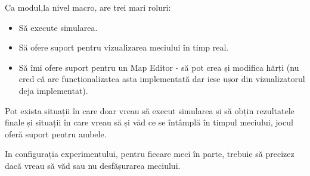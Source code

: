 \documentclass{article}
\begin{document}
Ca modul,la nivel macro, are trei mari roluri:
\begin{itemize}
    \item Să execute simularea.
    \item Să ofere suport pentru vizualizarea meciului în timp real.
    \item Să îmi ofere suport pentru un Map Editor - să pot crea și modifica hărți (nu cred că are funcționalizatea asta implementată dar iese ușor din vizualizatorul deja implementat).
\end{itemize}

Pot exista situații în care doar vreau să execut simularea și să obțin rezultatele finale și situații în care vreau să și văd ce se întâmplă în timpul meciului, jocul oferă suport pentru ambele.

In configurația experimentului, pentru fiecare meci în parte, trebuie să precizez dacă vreau să văd sau nu desfășurarea meciului.\\
\end{document}
